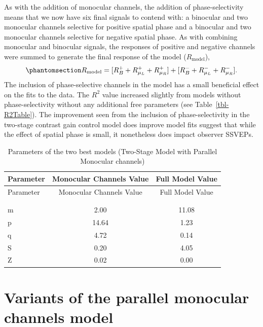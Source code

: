 \documentclass[
  12pt,
]{article}
\begin{document}
As with the addition of monocular channels, the addition of
phase-selectivity means that we now have six final signals to contend
with: a binocular and two monocular channels selective for positive
spatial phase and a binocular and two monocular channels selective for
negative spatial phase. As with combining monocular and binocular
signals, the responses of positive and negative channels were summed to
generate the final response of the model (\(R_\text{model}\)),
\begin{equation}\phantomsection\label{eq-finalSum}{
R_\text{model} = [R^+_B+R^+_{\mu_L}+R^+_{\mu_R}] + [R^-_B+R^-_{\mu_L}+R^-_{\mu_R}].
}\end{equation} The inclusion of phase-selective channels in the model
has a small beneficial effect on the fits to the data. The \(R^2\) value
increased slightly from models without phase-selectivity without any
additional free parameters (see Table~\ref{tbl-R2Table}). The
improvement seen from the inclusion of phase-selectivity in the
two-stage contrast gain control model does improve model fits suggest
that while the effect of spatial phase is small, it nonetheless does
impact observer SSVEPs.

\begin{longtable}[]{@{}lcc@{}}
\toprule\noalign{}
Parameter & Monocular Channels Value & Full Model Value \\
\midrule\noalign{}
\endfirsthead
\toprule\noalign{}
Parameter & Monocular Channels Value & Full Model Value \\
\midrule\noalign{}
\endhead
\bottomrule\noalign{}
\tabularnewline
\caption{Parameters of the two best models (Two-Stage Model with
Parallel Monocular channels)}\label{tbl-modelParameters}\tabularnewline
\endlastfoot
m & 2.00 & 11.08 \\
p & 14.64 & 1.23 \\
q & 4.72 & 0.14 \\
S & 0.20 & 4.05 \\
Z & 0.02 & 0.00 \\
\end{longtable}

\section{Variants of the parallel monocular channels
model}\label{variants-of-the-parallel-monocular-channels-model}
\end{document}
